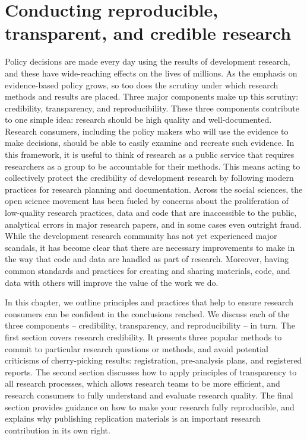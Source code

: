 \documentclass[
]{book}
\begin{document}
\hypertarget{reproducibility}{%
\chapter{Conducting reproducible, transparent, and credible research}\label{reproducibility}}

Policy decisions are made every day using the results of development research,
and these have wide-reaching effects on the lives of millions.
As the emphasis on evidence-based policy grows,
so too does the scrutiny under which research methods and results are placed.
Three major components make up this scrutiny:
credibility, transparency, and reproducibility.
These three components contribute to one simple idea:
research should be high quality and well-documented.
Research consumers, including the policy makers who will use the evidence to make decisions,
should be able to easily examine and recreate such evidence.
In this framework, it is useful to think of research as a public service
that requires researchers as a group to be accountable for their methods.
This means acting to collectively protect the credibility of development research
by following modern practices for research planning and documentation.
Across the social sciences, the open science movement has been fueled
by concerns about the proliferation of low-quality research practices,
data and code that are inaccessible to the public,
analytical errors in major research papers,
and in some cases even outright fraud.
While the development research community has not yet
experienced major scandals,
it has become clear that there are necessary improvements to make
in the way that code and data are handled as part of research.
Moreover, having common standards and practices
for creating and sharing materials, code, and data with others
will improve the value of the work we do.

In this chapter, we outline principles and practices that help to ensure
research consumers can be confident in the conclusions reached.
We discuss each of the three components --
credibility, transparency, and reproducibility -- in turn.
The first section covers research credibility.
It presents three popular methods to commit to particular research questions or methods,
and avoid potential criticisms of cherry-picking results:
registration, pre-analysis plans, and registered reports.
The second section discusses how to apply principles of transparency to all research processes,
which allows research teams to be more efficient, and
research consumers to fully understand and evaluate research quality.
The final section provides guidance on how to make your research fully reproducible,
and explains why publishing replication materials is an important research contribution in its own right.
\end{document}
